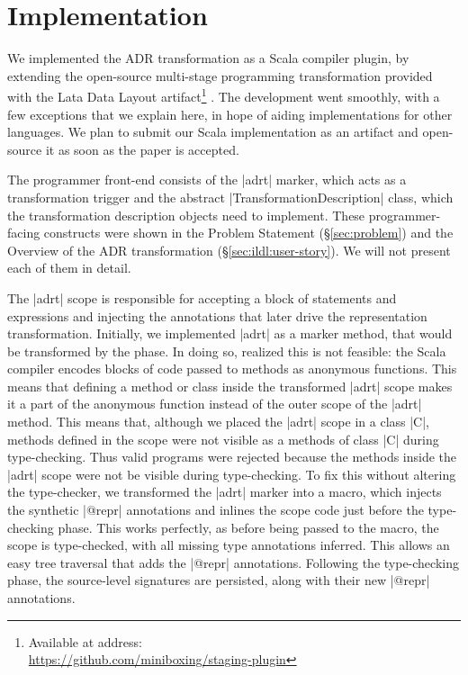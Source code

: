 \section{Implementation}
\label{sec:impl}

We implemented the ADR transformation as a Scala compiler plugin, by extending the open-source multi-stage programming transformation provided with the Lata Data Layout artifact\footnote{Available at address:\\ \url{https://github.com/miniboxing/staging-plugin}} \cite{ldl}. The development went smoothly, with a few exceptions that we explain here, in hope of aiding implementations for other languages. We plan to submit our Scala implementation as an artifact and open-source it as soon as the paper is accepted.

The programmer front-end consists of the |adrt| marker, which acts as a transformation trigger and the abstract |TransformationDescription| class, which the transformation description objects need to implement. These programmer-facing constructs were shown in the Problem Statement (\S\ref{sec:problem}) and the Overview of the ADR transformation (\S\ref{sec:ildl:user-story}). We will not present each of them in detail.

The |adrt| scope is responsible for accepting a block of statements and expressions and injecting the annotations that later drive the representation transformation. Initially, we implemented |adrt| as a marker method, that would be transformed by the \inject{} phase. In doing so, realized this is not feasible: the Scala compiler encodes blocks of code passed to methods as anonymous functions. This means that defining a method or class inside the transformed |adrt| scope makes it a part of the anonymous function instead of the outer scope of the |adrt| method. This means that, although we placed the |adrt| scope in a class |C|, methods defined in the scope were not visible as a methods of class |C| during type-checking. Thus valid programs were rejected because the methods inside the |adrt| scope were not be visible during type-checking. To fix this without altering the type-checker, we transformed the |adrt| marker into a macro, which injects the synthetic |@repr| annotations and inlines the scope code just before the type-checking phase. This works perfectly, as before being passed to the macro, the scope is type-checked, with all missing type annotations inferred. This allows an easy tree traversal that adds the |@repr| annotations. Following the type-checking phase, the source-level signatures are persisted, along with their new |@repr| annotations.

